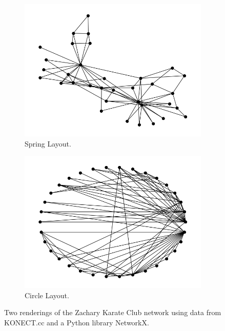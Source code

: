 \begin{figure}
    \begin{center}
        \begin{subfigure}[b]{0.45\textwidth}
            \includegraphics[width=\textwidth]{img/zachary_spring}
            \caption{Spring Layout.}
            \label{fig:zachary_spring}
        \end{subfigure}
        \begin{subfigure}[b]{0.45\textwidth}
            \includegraphics[width=\textwidth]{img/zachary_circle}
            \caption{Circle Layout.}
            \label{fig:zachary_circle}
        \end{subfigure}
    \end{center}
    \caption{Two renderings of the Zachary Karate Club network using data from KONECT.cc\cite{konect} and a Python library NetworkX.\cite{SciPyProceedings_11}}
    \label{fig:zachary_digrams}
\end{figure}

